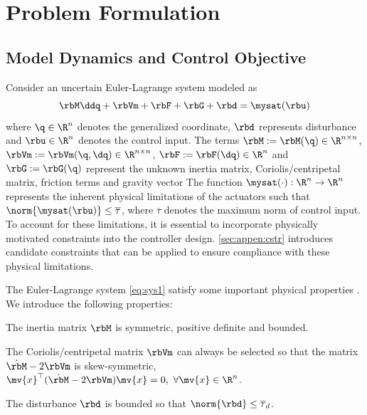 \documentclass[lettersize,journal]{IEEEtran}
\begin{document}
\section{Problem Formulation}\label{sec:Problem Formulation}

\subsection{Model Dynamics and Control Objective}

Consider an uncertain Euler-Lagrange system modeled as
\begin{equation}
    \rbM\ddq + \rbVm + \rbF + \rbG + \rbd
    =
    \mysat(\rbu)
    \label{eq:sys1}
\end{equation}
where $\q\in \R^n$ denotes the generalized coordinate, $\rbd$ represents disturbance and $\rbu\in\R^n$ denotes the control input. 
The terms $\rbM:=\rbM(\q)\in\R^{n\times n}$, $\rbVm:=\rbVm(\q,\dq)\in\R^{n\times n}$, $\rbF:=\rbF(\dq)\in\R^{n}$ and $\rbG:=\rbG(\q)$ represent the unknown inertia matrix, Coriolis/centripetal matrix, friction terms and gravity vector
The function $\mysat(\cdot):\R^n\to\R^n$ represents the inherent physical limitations of the actuators such that $\norm{\mysat(\rbu)}\le \overline\tau$, where $\overline\tau$ denotes the maximum norm of control input.
To account for these limitations, it is essential to incorporate physically motivated constraints into the controller design.
\ref{sec:appen:cstr} introduces candidate constraints that can be applied to ensure compliance with these physical limitations.

The Euler-Lagrange system \eqref{eq:sys1} satisfy some important physical properties \cite[see, Chap. 3 Tab. 3.2.1]{Lewis:1998aa}.
We introduce the following properties:
\begin{prop} 
    The inertia matrix $\rbM$ is symmetric, positive definite and bounded.
    \label{prop:M}
\end{prop}

\begin{prop} 
    The Coriolis/centripetal matrix $\rbVm$ can always be selected so that the matrix $\dot{\rbM}-2\rbVm$ is skew-symmetric, \ie $\mv{x}^\top(\dot{\rbM}-2\rbVm)\mv{x}=0,\ \forall \mv{x}\in\R^n$.
    \label{prop:skew}
\end{prop}

\begin{prop}
    The disturbance $\rbd$ is bounded so that $\norm{\rbd}\le \overline\tau_d$.
    \label{prop:dis_bound}
\end{prop}
\end{document}
